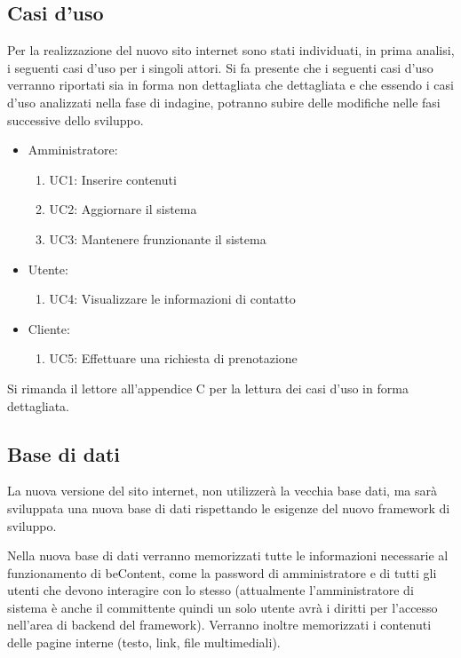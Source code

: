 \documentclass[a4paper,12pt,hidelinks]{report}
\begin{document}
  \subsection{Casi d'uso}
    Per la realizzazione del nuovo sito internet sono stati individuati, in prima analisi, i seguenti casi d'uso per i singoli attori. Si fa presente che i seguenti casi d'uso verranno
    riportati sia in forma non dettagliata che dettagliata e che essendo i casi d'uso analizzati nella fase di indagine, potranno subire delle modifiche nelle fasi successive dello sviluppo.
    \begin{itemize}
    \item Amministratore:
      \begin{enumerate}
	\item UC1: Inserire contenuti
	\item UC2: Aggiornare il sistema
	\item UC3: Mantenere frunzionante il sistema
      \end{enumerate}
    \item Utente: 
      \begin{enumerate}
	\item UC4: Visualizzare le informazioni di contatto
      \end{enumerate}
    \item Cliente: 
      \begin{enumerate}
	\item UC5: Effettuare una richiesta di prenotazione
      \end{enumerate}
    \end{itemize}
    Si rimanda il lettore all'appendice C per la lettura dei casi d'uso in forma dettagliata.

  \subsection{Base di dati}
    La nuova versione del sito internet, non utilizzerà la vecchia base dati, ma sarà sviluppata una nuova base di dati rispettando le esigenze del nuovo framework di sviluppo.
    \par Nella nuova base di dati verranno memorizzati tutte le informazioni necessarie al funzionamento di beContent, come la password di amministratore e di tutti gli utenti che devono
    interagire con lo stesso (attualmente l'amministratore di sistema è anche il committente quindi un solo utente avrà i diritti per l'accesso nell'area di backend del framework).
    Verranno inoltre memorizzati i contenuti delle pagine interne (testo, link, file multimediali).
\end{document}
